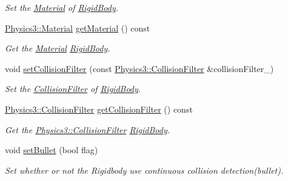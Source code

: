 \begin{DoxyCompactItemize}
\begin{DoxyCompactList}\small\item\em Set the \hyperlink{class_i_dream_sky_1_1_physics3_1_1_material}{Material} of \hyperlink{class_i_dream_sky_1_1_physics3_1_1_rigid_body}{Rigid\+Body}. \end{DoxyCompactList}\item 
\hyperlink{class_i_dream_sky_1_1_physics3_1_1_material}{Physics3\+::\+Material} \hyperlink{class_i_dream_sky_1_1_physics3_1_1_vehicle_a6efeccc635c0ee30886d7f1f78bb0be1}{get\+Material} () const 
\begin{DoxyCompactList}\small\item\em Get the \hyperlink{class_i_dream_sky_1_1_physics3_1_1_material}{Material} \hyperlink{class_i_dream_sky_1_1_physics3_1_1_rigid_body}{Rigid\+Body}. \end{DoxyCompactList}\item 
void \hyperlink{class_i_dream_sky_1_1_physics3_1_1_vehicle_aedfac3d763599f3a7ced252ab927781c}{set\+Collision\+Filter} (const \hyperlink{class_i_dream_sky_1_1_physics3_1_1_collision_filter}{Physics3\+::\+Collision\+Filter} \&collision\+Filter\+\_\+)
\begin{DoxyCompactList}\small\item\em Set the \hyperlink{class_i_dream_sky_1_1_physics3_1_1_collision_filter}{Collision\+Filter} of \hyperlink{class_i_dream_sky_1_1_physics3_1_1_rigid_body}{Rigid\+Body}. \end{DoxyCompactList}\item 
\hyperlink{class_i_dream_sky_1_1_physics3_1_1_collision_filter}{Physics3\+::\+Collision\+Filter} \hyperlink{class_i_dream_sky_1_1_physics3_1_1_vehicle_aff181704024c69e40bf6c899c2f27bbc}{get\+Collision\+Filter} () const 
\begin{DoxyCompactList}\small\item\em Get the \hyperlink{class_i_dream_sky_1_1_physics3_1_1_collision_filter}{Physics3\+::\+Collision\+Filter} \hyperlink{class_i_dream_sky_1_1_physics3_1_1_rigid_body}{Rigid\+Body}. \end{DoxyCompactList}\item 
void \hyperlink{class_i_dream_sky_1_1_physics3_1_1_vehicle_ac21d2055c56572be5d69d5f7f9336419}{set\+Bullet} (bool flag)
\begin{DoxyCompactList}\small\item\em Set whether or not the Rigidbody use continuous collision detection(bullet). \end{DoxyCompactList}\item 

\end{DoxyCompactItemize}
